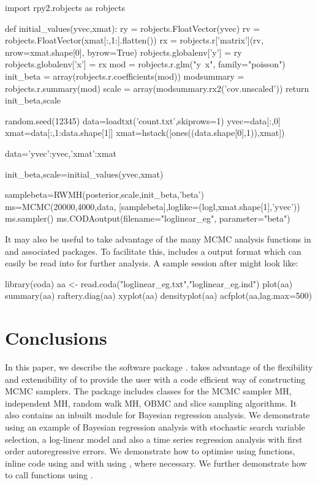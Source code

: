 \documentclass[article]{jss}
\begin{document}
\begin{Code}

import rpy2.robjects as robjects

def initial_values(yvec,xmat):
    ry = robjects.FloatVector(yvec)
    rv = robjects.FloatVector(xmat[:,1:].flatten())
    rx = robjects.r['matrix'](rv, nrow=xmat.shape[0],
                              byrow=True)
    robjects.globalenv['y'] = ry
    robjects.globalenv['x'] = rx
    mod = robjects.r.glm("y~x", family="poisson")
    init_beta =  array(robjects.r.coefficients(mod))
    modsummary = robjects.r.summary(mod)
    scale = array(modsummary.rx2('cov.unscaled'))
    return init_beta,scale


random.seed(12345) 
data=loadtxt('count.txt',skiprows=1)
yvec=data[:,0]
xmat=data[:,1:data.shape[1]]
xmat=hstack([ones((data.shape[0],1)),xmat])

data={'yvec':yvec,'xmat':xmat} 

init_beta,scale=initial_values(yvec,xmat)

samplebeta=RWMH(posterior,scale,init_beta,'beta')
ms=MCMC(20000,4000,data, [samplebeta],loglike=(logl,xmat.shape[1],'yvec'))
ms.sampler()
ms.CODAoutput(filename="loglinear_eg", parameter="beta") 

\end{Code}


It may also be useful to take advantage of the many MCMC analysis
functions in  and associated packages. To facilitate this,
 includes a 
\citep{Rnews:Plummer+Best+Cowles+Vines:2006} output format which can
easily be read into  for further analysis. A sample
 session after  might look like:


\begin{Code}
library(coda)
aa <- read.coda("loglinear_eg.txt","loglinear_eg.ind")
plot(aa)
summary(aa)
raftery.diag(aa)
xyplot(aa)
densityplot(aa)
acfplot(aa,lag.max=500)

\end{Code}



\section{Conclusions}
\label{sec:Conclusions}

In this paper, we describe the  software
package .   takes advantage of the flexibility
and extensibility of  to provide the user with a code
efficient way of constructing MCMC samplers. The  package
includes classes for the MCMC sampler MH, independent MH, random walk
MH, OBMC and slice sampling algorithms.  It also contains an inbuilt
module for Bayesian regression analysis.  We demonstrate 
using an example of Bayesian regression analysis with stochastic
search variable selection, a log-linear model and also a time series
regression analysis with first order autoregressive errors. We
demonstrate how to optimise  using  functions,
inline  code using  and with
 using , where necessary.  We further
demonstrate how to call  functions using .
 
\end{document}
